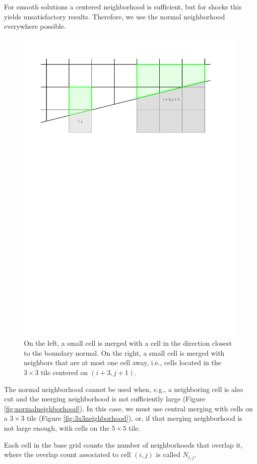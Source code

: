 For smooth solutions a centered neighborhood is sufficient, but for shocks this yields unsatisfactory results. Therefore, we use the normal neighborhood everywhere possible.
\begin{figure}[t]
    \centering
    \includegraphics[width=0.5\linewidth]{figs/neighborhoods.pdf}
    \caption{\sf On the left, a small cell is merged with a cell in the direction closest to the 
    	boundary normal.  On the right, a small cell is merged with neighbors that are at most one cell away, i.e., cells located in the $3\times3$ tile centered on $(i+3,j+1)$.}
    \label{fig:neighborhoods}
\end{figure}
The normal neighborhood cannot be used when, e.g., a neighboring cell is also cut and the
merging neighborhood is not sufficiently large (Figure \ref{fig:normalneighborhood}).  In this case, we must use central merging with cells on a $3\times3$ tile (Figure \ref{fig:3x3neighborhood}), or, if that merging neighborhood is not large enough, with cells on the $5 \times 5$ tile.



Each cell in the base grid counts the number of neighborhoods that overlap it, where the overlap count associated to cell $(i,j)$ is called $N_{i,j}$.

